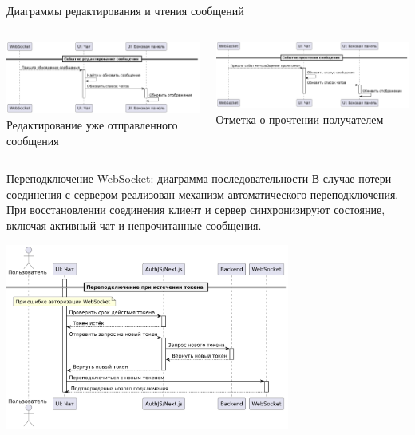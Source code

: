 \documentclass[aspectratio=169]{beamer}
\begin{document}
\begin{frame}{Диаграммы редактирования и чтения сообщений}
\vspace{0.5em}

\begin{columns}
    \begin{column}{0.5\textwidth}
        \centering
        \includegraphics[width=0.95\linewidth]{static/MessageEditDiagram.png} \\
        \small Редактирование уже отправленного сообщения
    \end{column}
    \begin{column}{0.5\textwidth}
        \centering
        \includegraphics[width=0.95\linewidth]{static/MessageReadDiagram.png} \\
        \small Отметка о прочтении получателем
    \end{column}
\end{columns}
\end{frame}

\begin{frame}{Переподключение WebSocket: диаграмма последовательности}
\small
\justifying
В случае потери соединения с сервером реализован механизм автоматического переподключения. При восстановлении соединения клиент и сервер синхронизируют состояние, включая активный чат и непрочитанные сообщения.

\vspace{0.5em}

\centering
\includegraphics[width=0.7\textwidth]{static/WsReconnectSequence.png}
\end{frame}
\end{document}
